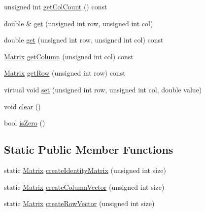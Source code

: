 \begin{DoxyCompactItemize}
\item 
unsigned int \hyperlink{classopen_mind_1_1math_1_1_matrix_a77aed5a66ee4b1be653e78a147cea85b}{get\+Col\+Count} () const 
\item 
double \& \hyperlink{classopen_mind_1_1math_1_1_matrix_aa1ac603bc50f58e1a081054a43c83cf5}{get} (unsigned int row, unsigned int col)
\item 
double \hyperlink{classopen_mind_1_1math_1_1_matrix_ac5042751f09bb28fd0ed6665eb57efcb}{get} (unsigned int row, unsigned int col) const 
\item 
\hyperlink{classopen_mind_1_1math_1_1_matrix}{Matrix} \hyperlink{classopen_mind_1_1math_1_1_matrix_afe8cd77ce42f8b9bb0c71c09f110f4c7}{get\+Column} (unsigned int col) const 
\item 
\hyperlink{classopen_mind_1_1math_1_1_matrix}{Matrix} \hyperlink{classopen_mind_1_1math_1_1_matrix_ac715d1ae670ca0a58d6ad77958dba814}{get\+Row} (unsigned int row) const 
\item 
virtual void \hyperlink{classopen_mind_1_1math_1_1_matrix_a15b18dbaa991db26b1efbcf347c65172}{set} (unsigned int row, unsigned int col, double value)
\item 
void \hyperlink{classopen_mind_1_1math_1_1_matrix_a4240e718f22e8ebd4eed3715857458d1}{clear} ()
\item 
bool \hyperlink{classopen_mind_1_1math_1_1_matrix_afb4e025f38dfd297dfa9d502ff711b85}{is\+Zero} ()
\end{DoxyCompactItemize}
\subsection*{Static Public Member Functions}
\begin{DoxyCompactItemize}
\item 
static \hyperlink{classopen_mind_1_1math_1_1_matrix}{Matrix} \hyperlink{classopen_mind_1_1math_1_1_matrix_aea14d43a85554a590973fa1d6f30a9fb}{create\+Identity\+Matrix} (unsigned int size)
\item 
static \hyperlink{classopen_mind_1_1math_1_1_matrix}{Matrix} \hyperlink{classopen_mind_1_1math_1_1_matrix_a308ed58506f0de62b4a9550769ee81c2}{create\+Column\+Vector} (unsigned int size)
\item 
static \hyperlink{classopen_mind_1_1math_1_1_matrix}{Matrix} \hyperlink{classopen_mind_1_1math_1_1_matrix_a09a4329970ba58398b1af8aa2e3c8f9b}{create\+Row\+Vector} (unsigned int size)
\end{DoxyCompactItemize}



